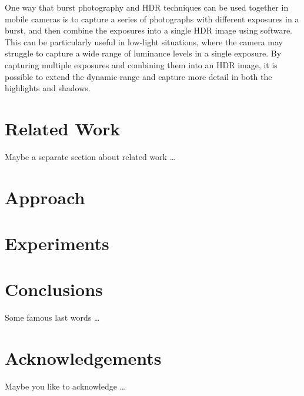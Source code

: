 \documentclass{egpubl}
\begin{document}
One way that burst photography and HDR techniques can be used together in mobile cameras 
is to capture a series of photographs with different exposures in a burst, and then combine 
the exposures into a single HDR image using software. This can be particularly useful in 
low-light situations, where the camera may struggle to capture a wide range of luminance 
levels in a single exposure. By capturing multiple exposures and combining them into an 
HDR image, it is possible to extend the dynamic range and capture more detail in both the 
highlights and shadows.

\cite{Hasinoff2016Burst}



\section{Related Work}
\label{sec:related_work}
Maybe a separate section about related work \ldots 
\blindtext


\section{Approach}
\label{sec:approach}
\blindtext


\section{Experiments}
\label{sec:Experiments}
\blindtext


\section{Conclusions}
\label{sec:conclusion}
Some famous last words \ldots
\blindtext


\section{Acknowledgements}
\label{sec:acknowledgements}
Maybe you like to acknowledge \ldots 


%


\end{document}
